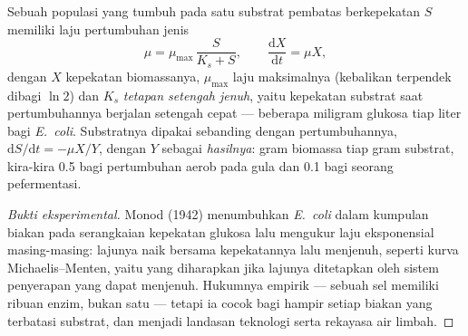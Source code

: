 \begin{theorem}\label{thm:b2:microbial-metabolism:monod}
Sebuah populasi yang tumbuh pada satu substrat pembatas berkepekatan
$S$ memiliki laju pertumbuhan jenis
\[
\mu = \mu_{\max}\,\frac{S}{K_s + S}, \qquad \frac{\mathrm{d}X}{\mathrm{d}t} = \mu X,
\]
dengan $X$ kepekatan biomassanya, $\mu_{\max}$ laju maksimalnya
(kebalikan  terpendek dibagi
$\ln 2$) dan $K_s$ \emph{tetapan setengah jenuh}, yaitu kepekatan
substrat saat pertumbuhannya berjalan setengah cepat --- beberapa
miligram glukosa tiap liter bagi \emph{E.~coli}. Substratnya dipakai
sebanding dengan pertumbuhannya, $\mathrm{d}S/\mathrm{d}t =
-\mu X/Y$, dengan $Y$ sebagai \emph{hasilnya}: gram biomassa tiap gram
substrat, kira-kira \num{0.5} bagi pertumbuhan aerob pada gula dan
\num{0.1} bagi seorang pefermentasi.
\end{theorem}
\begin{proof}[Bukti eksperimental]
Monod (1942) menumbuhkan \emph{E.~coli} dalam kumpulan biakan pada
serangkaian kepekatan glukosa lalu mengukur laju eksponensial
masing-masing: lajunya naik bersama kepekatannya lalu menjenuh, seperti
kurva Michaelis--Menten, yaitu yang diharapkan jika lajunya ditetapkan
oleh sistem penyerapan yang dapat menjenuh. Hukumnya empirik --- sebuah
sel memiliki ribuan enzim, bukan satu --- tetapi ia cocok bagi hampir
setiap biakan yang terbatasi substrat, dan menjadi landasan teknologi
 serta rekayasa air limbah.
\end{proof}

